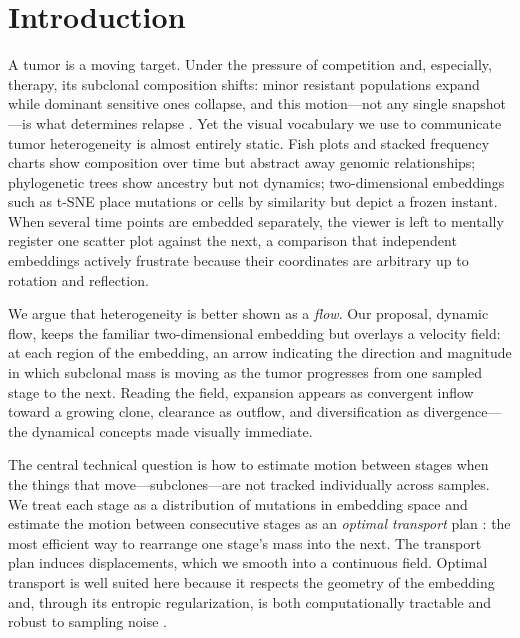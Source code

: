 \documentclass{article}
\begin{document}
\section{Introduction}

A tumor is a moving target. Under the pressure of competition and, especially,
therapy, its subclonal composition shifts: minor resistant populations expand while
dominant sensitive ones collapse, and this motion---not any single snapshot---is what
determines relapse \citep{Gerlinger2012,McGranahan2015}. Yet the visual vocabulary we
use to communicate tumor heterogeneity is almost entirely static. Fish plots and
stacked frequency charts show composition over time but abstract away genomic
relationships; phylogenetic trees show ancestry but not dynamics; two-dimensional
embeddings such as t-SNE \citep{Maaten2008} place mutations or cells by similarity but
depict a frozen instant. When several time points are embedded separately, the
viewer is left to mentally register one scatter plot against the next, a comparison
that independent embeddings actively frustrate because their coordinates are
arbitrary up to rotation and reflection.

We argue that heterogeneity is better shown as a \emph{flow}. Our proposal, dynamic
flow, keeps the familiar two-dimensional embedding but overlays a velocity field: at
each region of the embedding, an arrow indicating the direction and magnitude in
which subclonal mass is moving as the tumor progresses from one sampled stage to the
next. Reading the field, expansion appears as convergent inflow toward a growing
clone, clearance as outflow, and diversification as divergence---the dynamical
concepts made visually immediate.

The central technical question is how to estimate motion between stages when the
things that move---subclones---are not tracked individually across samples. We treat
each stage as a distribution of mutations in embedding space and estimate the motion
between consecutive stages as an \emph{optimal transport} plan
\citep{Villani2009,Cuturi2013}: the most efficient way to rearrange one stage's mass
into the next. The transport plan induces displacements, which we smooth into a
continuous field. Optimal transport is well suited here because it respects the
geometry of the embedding and, through its entropic regularization, is both
computationally tractable and robust to sampling noise \citep{Cuturi2013}.
\end{document}
